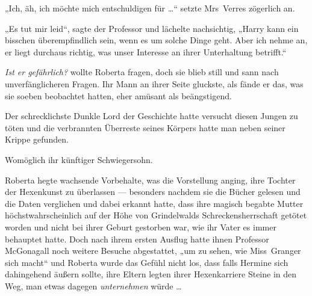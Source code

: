 „Ich, äh, ich möchte mich entschuldigen für …“ setzte Mrs~Verres zögerlich an.

„Es tut mir leid“, sagte der Professor und lächelte nachsichtig,
„Harry kann ein bisschen überempfindlich sein, wenn es um solche Dinge geht. Aber ich nehme an, er liegt durchaus richtig, was unser Interesse an ihrer Unterhaltung betrifft.“

\emph{Ist er gefährlich?} wollte Roberta fragen, doch sie blieb still und sann nach unverfänglicheren Fragen. Ihr Mann an ihrer Seite gluckste, als fände er das, was sie soeben beobachtet hatten, eher amüsant als beängstigend.

Der schrecklichste Dunkle Lord der Geschichte hatte versucht diesen Jungen zu töten und die verbrannten Überreste seines Körpers hatte man neben seiner Krippe gefunden.

Womöglich ihr künftiger Schwiegersohn.

Roberta hegte wachsende Vorbehalte, was die Vorstellung anging, ihre Tochter der Hexenkunst zu überlassen — besonders nachdem sie die Bücher gelesen und die Daten verglichen und dabei erkannt hatte, dass ihre magisch begabte Mutter höchstwahrscheinlich auf der Höhe von Grindelwalds Schreckensherrschaft getötet worden und nicht bei ihrer Geburt gestorben war, wie ihr Vater es immer behauptet hatte. Doch nach ihrem ersten Ausflug hatte ihnen Professor McGonagall noch weitere Besuche abgestattet, „um zu sehen, wie Miss~Granger sich macht“ und Roberta wurde das Gefühl nicht los, dass falls Hermine sich dahingehend äußern sollte, ihre Eltern legten ihrer Hexenkarriere Steine in den Weg, man etwas dagegen \emph{unternehmen} würde …

